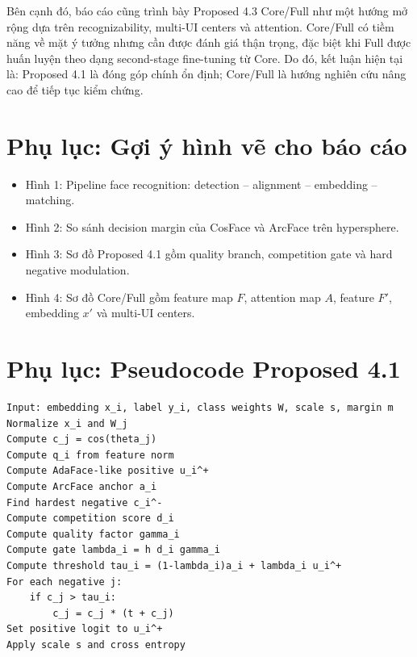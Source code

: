 \documentclass[13pt,a4paper]{extreport}
\begin{document}
Bên cạnh đó, báo cáo cũng trình bày Proposed 4.3 Core/Full như một hướng mở rộng dựa trên recognizability, multi-UI centers và attention. Core/Full có tiềm năng về mặt ý tưởng nhưng cần được đánh giá thận trọng, đặc biệt khi Full được huấn luyện theo dạng second-stage fine-tuning từ Core. Do đó, kết luận hiện tại là: Proposed 4.1 là đóng góp chính ổn định; Core/Full là hướng nghiên cứu nâng cao để tiếp tục kiểm chứng.

\appendix
\chapter{Phụ lục: Gợi ý hình vẽ cho báo cáo}
\begin{itemize}[leftmargin=1.2cm]
    \item Hình 1: Pipeline face recognition: detection -- alignment -- embedding -- matching.
    \item Hình 2: So sánh decision margin của CosFace và ArcFace trên hypersphere.
    \item Hình 3: Sơ đồ Proposed 4.1 gồm quality branch, competition gate và hard negative modulation.
    \item Hình 4: Sơ đồ Core/Full gồm feature map $F$, attention map $A$, feature $F'$, embedding $x'$ và multi-UI centers.
\end{itemize}

\chapter{Phụ lục: Pseudocode Proposed 4.1}
\begin{verbatim}
Input: embedding x_i, label y_i, class weights W, scale s, margin m
Normalize x_i and W_j
Compute c_j = cos(theta_j)
Compute q_i from feature norm
Compute AdaFace-like positive u_i^+
Compute ArcFace anchor a_i
Find hardest negative c_i^-
Compute competition score d_i
Compute quality factor gamma_i
Compute gate lambda_i = h d_i gamma_i
Compute threshold tau_i = (1-lambda_i)a_i + lambda_i u_i^+
For each negative j:
    if c_j > tau_i:
        c_j = c_j * (t + c_j)
Set positive logit to u_i^+
Apply scale s and cross entropy
\end{verbatim}
\end{document}
